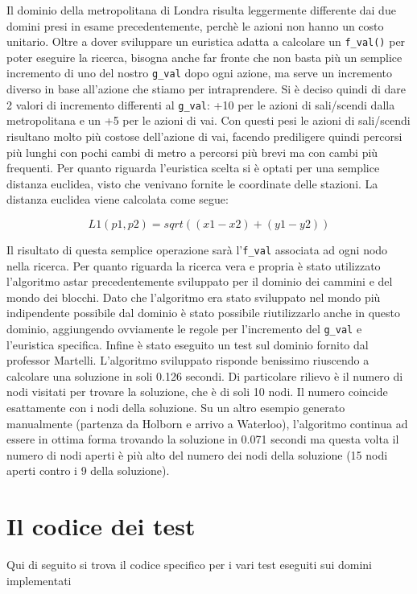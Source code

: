 Il dominio della metropolitana di Londra risulta leggermente differente dai due domini presi in esame precedentemente, perchè le azioni non hanno un costo unitario. Oltre a dover sviluppare un euristica adatta a calcolare un \lstinline{f_val()} per poter eseguire la ricerca, bisogna anche far fronte che non basta più un semplice incremento di uno del nostro \lstinline{g_val} dopo ogni azione, ma serve un incremento diverso in base all'azione che stiamo per intraprendere. Si è deciso quindi di dare 2 valori di incremento differenti al \lstinline{g_val}: +10 per le azioni di sali/scendi dalla metropolitana e un +5 per le azioni di vai. Con questi pesi le azioni di sali/scendi risultano molto più costose dell'azione di vai, facendo prediligere quindi percorsi più lunghi con pochi cambi di metro a percorsi più brevi ma con cambi più frequenti.
Per quanto riguarda l'euristica scelta si è optati per una semplice distanza euclidea, visto che venivano fornite le coordinate delle stazioni. La distanza euclidea viene calcolata come segue:

$$L1(p1,p2) = sqrt((x1 - x2)+(y1 - y2))$$

Il risultato di questa semplice operazione sarà l'\lstinline{f_val} associata ad ogni nodo nella ricerca.
Per quanto riguarda la ricerca vera e propria è stato utilizzato l'algoritmo astar precedentemente sviluppato per il dominio dei cammini e del mondo dei blocchi.
Dato che l'algoritmo era stato sviluppato nel mondo più indipendente possibile dal dominio è stato possibile riutilizzarlo anche in questo dominio, aggiungendo ovviamente le regole per l'incremento del \lstinline{g_val} e l'euristica specifica. Infine è stato eseguito un test sul dominio fornito dal professor Martelli. L'algoritmo sviluppato risponde benissimo riuscendo a calcolare una soluzione in soli 0.126 secondi. Di particolare rilievo è il numero di nodi visitati per trovare la soluzione, che è di soli 10 nodi. Il numero coincide esattamente con i nodi della soluzione. Su un altro esempio generato manualmente (partenza da Holborn e arrivo a Waterloo), l'algoritmo continua ad essere in ottima forma trovando la soluzione in 0.071 secondi ma questa volta il numero di nodi aperti è più alto del numero dei nodi della soluzione (15 nodi aperti contro i 9 della soluzione).

\newpage
\appendix
\section{Il codice dei test} \label{App:AppendixA}
Qui di seguito si trova il codice specifico per i vari test eseguiti sui domini implementati


